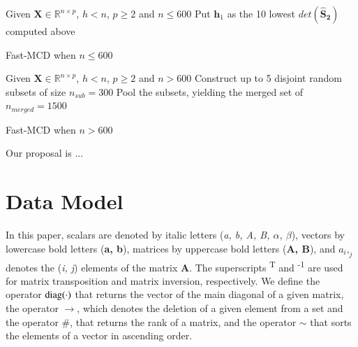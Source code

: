 \documentclass[review]{elsarticle}
\begin{document}
\begin{algorithm}[H]\label{alg:alg03}
	\scriptsize
	\SetAlgoLined
	Given $\boldsymbol{X} \in \mathbb{R}^{n \times p}$, $h < n$, $p \geq 2$ and $n \leq 600$\;
	Put $\boldsymbol{h}_1$ as the 10 lowest $det(\boldsymbol{\hat{S}_2})$ computed above\;
	\caption{Fast-MCD when $n \leq 600$}
\end{algorithm}

\begin{algorithm}[H]\label{alg:alg04}
	\scriptsize
	\SetAlgoLined
	Given $\boldsymbol{X} \in \mathbb{R}^{n \times p}$, $h < n$, $p \geq 2$ and $n > 600$\;
	Construct up to 5 disjoint random subsets of size $n_{sub} = 300$\;
	Pool the subsets, yielding the merged set of $n_{merged} = 1500$\;
	\caption{Fast-MCD when $n > 600$}
\end{algorithm}

Our proposal is ...

\section{Data Model}
\label{sec:datamodel}

In this paper, scalars are denoted by italic letters (\emph{a, b, A, B, $α$, $β$}), vectors by lowercase bold letters (\textbf{a, b}), matrices by uppercase bold letters (\textbf{A, B}), and $a_i,_j$ denotes the (\emph{i, j}) elements of the matrix \textbf{A}. The superscripts \textsuperscript{T} and \textsuperscript{-1} are used for matrix transposition and matrix inversion, respectively. We define the operator $\rm diag(\cdot)$ that returns the vector of the main diagonal of a given matrix, the operator $\rightarrow$, which denotes the deletion of a given element from a set and the operator $\#$, that returns the rank of a matrix, and the operator $\sim$ that sorts the elements of a vector in ascending order.
\end{document}
